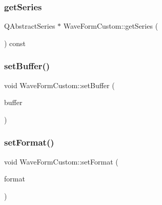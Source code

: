 \hypertarget{class_wave_form_custom_a76683067d578c13b6f5141c74590a746}{}\label{class_wave_form_custom_a76683067d578c13b6f5141c74590a746} 
\subsubsection{\texorpdfstring{get\+Series}{getSeries}}
{\footnotesize\ttfamily Q\+Abstract\+Series $\ast$ Wave\+Form\+Custom\+::get\+Series (\begin{DoxyParamCaption}{ }\end{DoxyParamCaption}) const\hspace{0.3cm}{\ttfamily [slot]}}

\hypertarget{class_wave_form_custom_aa30d2651a92723178f74d0d14fa13809}{}\label{class_wave_form_custom_aa30d2651a92723178f74d0d14fa13809} 
\subsubsection{\texorpdfstring{set\+Buffer()}{setBuffer()}}
{\footnotesize\ttfamily void Wave\+Form\+Custom\+::set\+Buffer (\begin{DoxyParamCaption}\item[{const Q\+Byte\+Array \&}]{buffer }\end{DoxyParamCaption})}

\hypertarget{class_wave_form_custom_a4280e281f1b4e91710c791751b4c956d}{}\label{class_wave_form_custom_a4280e281f1b4e91710c791751b4c956d} 
\subsubsection{\texorpdfstring{set\+Format()}{setFormat()}}
{\footnotesize\ttfamily void Wave\+Form\+Custom\+::set\+Format (\begin{DoxyParamCaption}\item[{const Q\+Audio\+Format \&}]{format }\end{DoxyParamCaption})}

\hypertarget{class_wave_form_custom_ac6c2dbc11bd5789cee99674077307799}{}\label{class_wave_form_custom_ac6c2dbc11bd5789cee99674077307799} 
